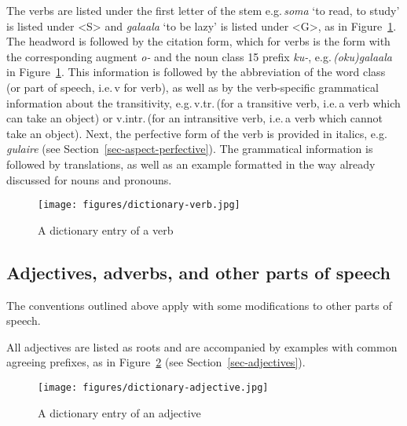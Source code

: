 The verbs are listed under the first letter of the stem e.g.\,\emph{soma} `to read, to study' is listed under <S> and \emph{galaala} `to be lazy' is listed under <G>, as in Figure~\ref{fig-verb}.
The headword is followed by the citation form, which for verbs is the form with the corresponding augment \emph{o-} and the noun class 15 prefix \emph{ku-}, e.g.\,\emph{(oku)galaala} in Figure~\ref{fig-verb}. 
This information is followed by the abbreviation of the word class (or part of speech, i.e.\,v for verb), as well as by the verb-specific grammatical information about the transitivity, e.g.\,v.tr.\,(for a transitive verb, i.e.\,a verb which can take an object) or v.intr.\,(for an intransitive verb, i.e.\,a verb which cannot take an object). 
Next, the perfective form of the verb is provided in italics, e.g.\,\emph{gulaire} (see Section~\ref{sec-aspect-perfective}). 
The grammatical information is followed by translations, as well as an example formatted in the way already discussed for nouns and pronouns. 

\begin{figure}[htb]
\begin{center}

 \texttt{[image: figures/dictionary-verb.jpg]}

 \caption{A dictionary entry of a verb}\label{fig-verb}
\end{center}
\end{figure}


\subsection{Adjectives, adverbs, and other parts of speech}

The conventions outlined above apply with some modifications to other parts of speech. 


All adjectives are listed as roots and are accompanied by examples with common agreeing prefixes, as in Figure~\ref{fig-adjective} (see Section~\ref{sec-adjectives}).

\begin{figure}[htb]
\begin{center}

 \texttt{[image: figures/dictionary-adjective.jpg]}

 \caption{A dictionary entry of an adjective}\label{fig-adjective}
\end{center}
\end{figure}


